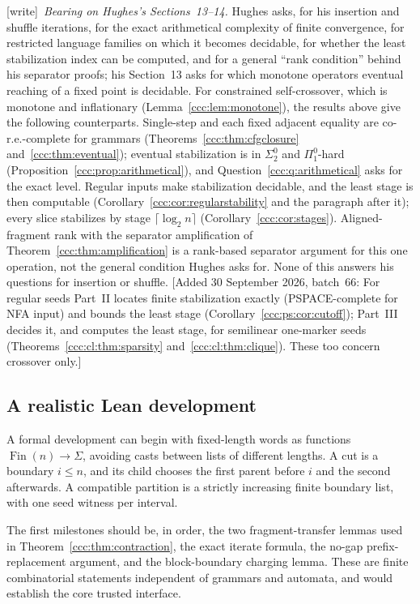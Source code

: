 \documentclass[11pt,letterpaper]{article}
\theoremstyle{definition}
\theoremstyle{remark}
\newcommand{\wtag}{\textup{[write]}}
\newcommand{\wadd}[1]{\textup{[}Added 30 September 2026, batch~66: #1\textup{]}}
\begin{document}
\wtag\ \emph{Bearing on Hughes's Sections~13--14.} Hughes asks, for his
insertion and shuffle iterations, for the exact arithmetical complexity of
finite convergence, for restricted language families on which it becomes
decidable, for whether the least stabilization index can be computed, and for
a general ``rank condition'' behind his separator proofs; his Section~13 asks
for which monotone operators eventual reaching of a fixed point is decidable.
For constrained self-crossover, which is monotone and inflationary
(Lemma~\ref{ccc:lem:monotone}), the results above give the following
counterparts. Single-step and each fixed adjacent equality are
co-r.e.-complete for grammars (Theorems~\ref{ccc:thm:cfgclosure}
and~\ref{ccc:thm:eventual}); eventual stabilization is in $\Sigma^0_2$ and
$\Pi^0_1$-hard (Proposition~\ref{ccc:prop:arithmetical}), and Question~\ref{ccc:q:arithmetical}
asks for the exact level. Regular inputs make stabilization decidable, and
the least stage is then computable (Corollary~\ref{ccc:cor:regularstability}
and the paragraph after it); every slice stabilizes by stage
$\lceil\log_2 n\rceil$ (Corollary~\ref{ccc:cor:stages}). Aligned-fragment rank
with the separator amplification of Theorem~\ref{ccc:thm:amplification} is a
rank-based separator argument for this one operation, not the general
condition Hughes asks for. None of this answers his questions for insertion
or shuffle.
\wadd{For regular seeds Part~II locates finite stabilization exactly
(PSPACE-complete for NFA input) and bounds the least stage
(Corollary~\ref{ccc:ps:cor:cutoff}); Part~III decides it, and computes the
least stage, for semilinear one-marker seeds (Theorems~\ref{ccc:cl:thm:sparsity}
and~\ref{ccc:cl:thm:clique}). These too concern crossover only.}

\subsection{A realistic Lean development}\label{ccc:sec:lean}

A formal development can begin with fixed-length words as functions
$\operatorname{Fin}(n)\to\Sigma$, avoiding casts between lists of different
lengths. A cut is a boundary $i\leq n$, and its child chooses the first
parent before $i$ and the second afterwards. A compatible partition is a
strictly increasing finite boundary list, with one seed witness per interval.

The first milestones should be, in order, the two fragment-transfer lemmas
used in Theorem~\ref{ccc:thm:contraction}, the exact iterate formula, the no-gap
prefix-replacement argument, and the block-boundary charging lemma. These are
finite combinatorial statements independent of grammars and automata, and
would establish the core trusted interface.
\end{document}
